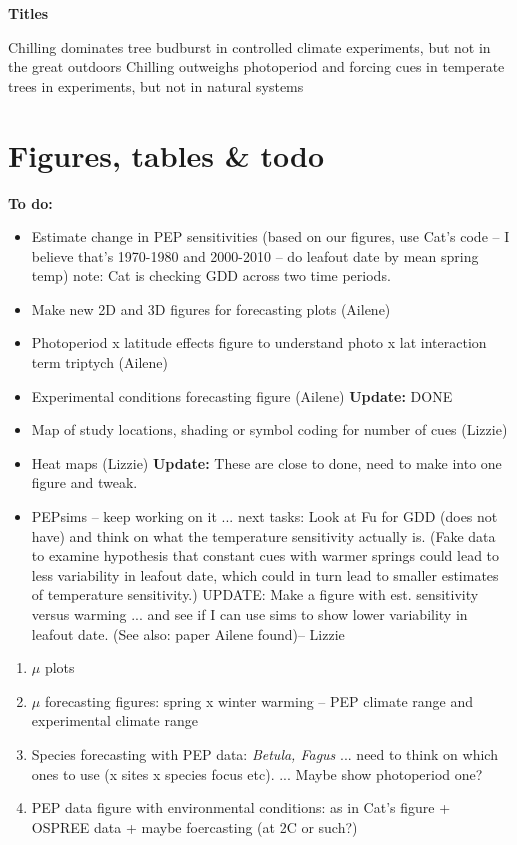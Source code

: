 \documentclass[11pt,letter]{article}
\begin{document}
%
 
\renewcommand{\refname}{\CHead{}}


{\bf Titles}

Chilling dominates tree budburst in controlled climate experiments, but not in the great outdoors
Chilling outweighs photoperiod and forcing cues in temperate trees in experiments, but not in natural systems



\section{Figures, tables \& todo}

{\bf To do:}
\begin{itemize}
\item Estimate change in PEP sensitivities (based on our figures, use Cat's code -- I believe that's 1970-1980 and 2000-2010 -- do leafout date by mean spring temp)
note: Cat is checking GDD across two time periods.
\item Make new 2D and 3D figures for forecasting plots (Ailene)
\item Photoperiod x latitude effects figure to understand photo x lat interaction term  triptych (Ailene)
\item Experimental conditions forecasting figure (Ailene) {\bf Update:}  DONE
\item Map of study locations, shading or symbol coding for number of cues (Lizzie)
\item Heat maps (Lizzie) {\bf Update:} These are close to done, need to make into one figure and tweak. 
\item PEPsims -- keep working on it ... next tasks: Look at Fu for GDD (does not have) and think on what the temperature sensitivity actually is. (Fake data to examine hypothesis that constant cues with warmer springs could lead to less variability in leafout date, which could in turn lead to smaller estimates of temperature sensitivity.) UPDATE: Make a figure with est. sensitivity versus warming ... and see if I can use sims to show lower variability in leafout date. (See also: paper Ailene found)-- Lizzie
\end{itemize}





\begin{enumerate}
\item $\mu$ plots
\item  $\mu$ forecasting figures: spring x winter warming -- PEP climate range and experimental climate range
\item Species forecasting with PEP data: \emph{Betula, Fagus} ... need to think on which ones to use (x sites x species focus etc). ... Maybe show photoperiod one?
\item PEP data figure with environmental conditions: as in Cat's figure + OSPREE data + maybe foercasting (at 2C or such?)
\end{enumerate}
\end{document}
